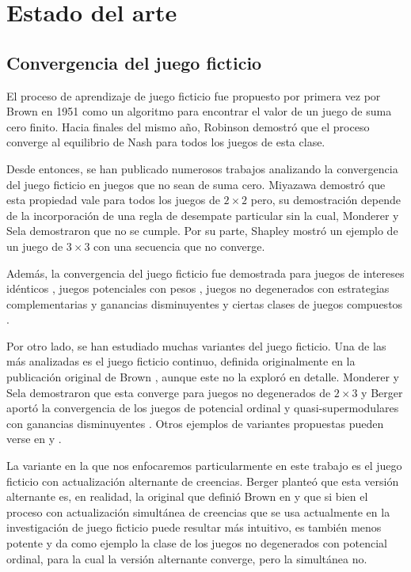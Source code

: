 \chapter{Estado del arte}  \label{cap:relwork}

\section{Convergencia del juego ficticio}

El proceso de aprendizaje de juego ficticio fue propuesto por primera vez por Brown en 1951 \cite{brown:1951} como un algoritmo para encontrar el valor de un juego de suma cero finito. Hacia finales del mismo año, Robinson \cite{robinson:zerosum} demostró que el proceso converge al equilibrio de Nash para todos los juegos de esta clase.

Desde entonces, se han publicado numerosos trabajos analizando la convergencia del juego ficticio en juegos que no sean de suma cero. Miyazawa \cite{miyazawa:2x2} demostró que esta propiedad vale para todos los juegos de $2 \times 2$ pero, su demostración depende de la incorporación de una regla de desempate particular sin la cual, Monderer y Sela \cite{2x2:without} demostraron que no se cumple. Por su parte, Shapley \cite{shapley:3x3} mostró un ejemplo de un juego de $3 \times 3$ con una secuencia que no converge.

Además, la convergencia del juego ficticio fue demostrada para juegos de intereses idénticos \cite{identical:interests}, juegos potenciales con pesos \cite{weighted:potential}, juegos no degenerados con estrategias complementarias y ganancias disminuyentes \cite{strategic:complementarities} y ciertas clases de juegos compuestos \cite{compound}.

Por otro lado, se han estudiado muchas variantes del juego ficticio. Una de las más analizadas es el juego ficticio continuo, definida originalmente en la publicación original de Brown \cite{brown:1951}, aunque este no la exploró en detalle. Monderer y Sela demostraron que esta converge para juegos no degenerados de $2 \times 3$ \cite{no:cycling} y Berger aportó la convergencia de los juegos de potencial ordinal y quasi-supermodulares con ganancias disminuyentes \cite{berger:two}. Otros ejemplos de variantes propuestas pueden verse en \cite{pattern:recog} y \cite{new:kind:fp}.

La variante en la que nos enfocaremos particularmente en este trabajo es el juego ficticio con actualización alternante de creencias. Berger \cite{browns:original} planteó que esta versión alternante es, en realidad, la original que definió Brown en \cite{brown:1951} y que si bien el proceso con actualización simultánea de creencias que se usa actualmente en la investigación de juego ficticio puede resultar más intuitivo, es también menos potente y da como ejemplo la clase de los juegos no degenerados con potencial ordinal, para la cual la versión alternante converge, pero la simultánea no.

